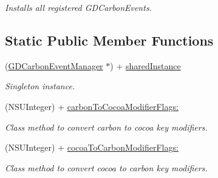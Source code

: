 \begin{DoxyCompactItemize}
\begin{DoxyCompactList}\small\item\em Installs all registered GDCarbonEvents. \item\end{DoxyCompactList}\end{DoxyCompactItemize}
\subsection*{Static Public Member Functions}
\begin{DoxyCompactItemize}
\item 
\hypertarget{interface_g_d_carbon_event_manager_a89ecaf8c7c3124a8337c2e082747a59a}{
(\hyperlink{interface_g_d_carbon_event_manager}{GDCarbonEventManager} $\ast$) + \hyperlink{interface_g_d_carbon_event_manager_a89ecaf8c7c3124a8337c2e082747a59a}{sharedInstance}}
\label{interface_g_d_carbon_event_manager_a89ecaf8c7c3124a8337c2e082747a59a}

\begin{DoxyCompactList}\small\item\em Singleton instance. \item\end{DoxyCompactList}\item 
\hypertarget{interface_g_d_carbon_event_manager_a196290f015b9a59450f954f619610b8e}{
(NSUInteger) + \hyperlink{interface_g_d_carbon_event_manager_a196290f015b9a59450f954f619610b8e}{carbonToCocoaModifierFlags:}}
\label{interface_g_d_carbon_event_manager_a196290f015b9a59450f954f619610b8e}

\begin{DoxyCompactList}\small\item\em Class method to convert carbon to cocoa key modifiers. \item\end{DoxyCompactList}\item 
\hypertarget{interface_g_d_carbon_event_manager_a993aa366c07f264a428bceb650073d11}{
(NSUInteger) + \hyperlink{interface_g_d_carbon_event_manager_a993aa366c07f264a428bceb650073d11}{cocoaToCarbonModifierFlags:}}
\label{interface_g_d_carbon_event_manager_a993aa366c07f264a428bceb650073d11}

\begin{DoxyCompactList}\small\item\em Class method to convert cocoa to carbon key modifiers. \item\end{DoxyCompactList}\end{DoxyCompactItemize}
